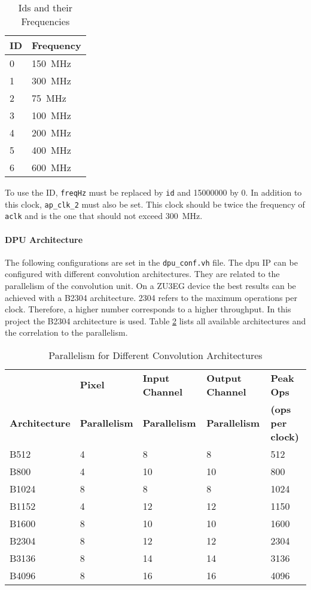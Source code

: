 \begin{table}
  \caption{Ids and their Frequencies}
  \label{tab:frequencies_ids}
  \centering
  \begin{tabular}{ll}
    \toprule
    \textbf{ID} & \textbf{Frequency} \\
    \midrule
    0 & \SI{150}{MHz} \\
    1 & \SI{300}{MHz} \\
    2 & \SI{75}{MHz} \\
    3 & \SI{100}{MHz} \\
    4 & \SI{200}{MHz} \\
    5 & \SI{400}{MHz} \\
    6 & \SI{600}{MHz} \\
    \bottomrule
  \end{tabular}
\end{table}

To use the ID, \texttt{freqHz} must be replaced by \texttt{id} and \num{15000000} by 0.
In addition to this clock, \texttt{ap\_clk\_2} must also be set.
This clock should be twice the frequency of \texttt{aclk} and is the one that should not exceed \SI{300}{MHz}.

\paragraph{DPU Architecture}
The following configurations are set in the \texttt{dpu\_conf.vh} file.
The \acrshort{dpu} IP can be configured with different convolution architectures.
They are related to the parallelism of the convolution unit.
On a ZU3EG device the best results can be achieved with a B2304 architecture.
\num{2304} refers to the maximum operations per clock.
Therefore, a higher number corresponds to a higher throughput.
In this project the B2304 architecture is used.
Table \ref{tab:arch_parallelism} lists all available architectures and the correlation to the parallelism.

\begin{table}
  \caption{Parallelism for Different Convolution Architectures \cite{dpu_product_guide}}
  \label{tab:arch_parallelism}
  \centering
  \begin{tabular}{lllll}
    \toprule
     & \textbf{Pixel} & \textbf{Input Channel} & \textbf{Output Channel} & \textbf{Peak Ops} \\
    \textbf{Architecture} & \textbf{Parallelism} & \textbf{Parallelism} & \textbf{Parallelism} & \textbf{(ops per clock)} \\
    \midrule
    B512 & 4 & 8 & 8 & 512 \\
    B800 & 4 & 10 & 10 & 800 \\
    B1024 & 8 & 8 & 8 & 1024 \\
    B1152 & 4 & 12 & 12 & 1150 \\
    B1600 & 8 & 10 & 10 & 1600 \\
    B2304 & 8 & 12 & 12 & 2304 \\
    B3136 & 8 & 14 & 14 & 3136 \\
    B4096 & 8 & 16 & 16 & 4096 \\
    \bottomrule
  \end{tabular}
\end{table}

